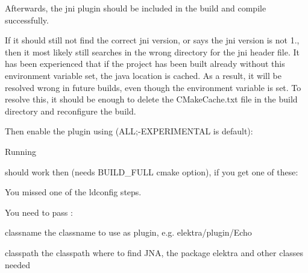 \begin{DoxyCode}{0}
\end{DoxyCode}


Afterwards, the jni plugin should be included in the build and compile successfully.

If it should still not find the correct jni version, or says the jni version is not 1., then it most likely still searches in the wrong directory for the jni header file. It has been experienced that if the project has been built already without this environment variable set, the java location is cached. As a result, it will be resolved wrong in future builds, even though the environment variable is set. To resolve this, it should be enough to delete the C\+Make\+Cache.\+txt file in the build directory and reconfigure the build.

Then enable the plugin using ({\ttfamily A\+LL;-\/E\+X\+P\+E\+R\+I\+M\+E\+N\+T\+AL} is default)\+:


\begin{DoxyCode}{0}
\end{DoxyCode}


Running


\begin{DoxyCode}{0}
\end{DoxyCode}


should work then (needs B\+U\+I\+L\+D\+\_\+\+F\+U\+LL cmake option), if you get one of these\+:


\begin{DoxyCode}{0}
\end{DoxyCode}


You missed one of the ldconfig steps.

You need to pass \+:


\begin{DoxyItemize}
\item classname the classname to use as plugin, e.\+g. {\ttfamily elektra/plugin/\+Echo}
\item classpath the classpath where to find J\+NA, the package elektra and other classes needed
\end{DoxyItemize}

